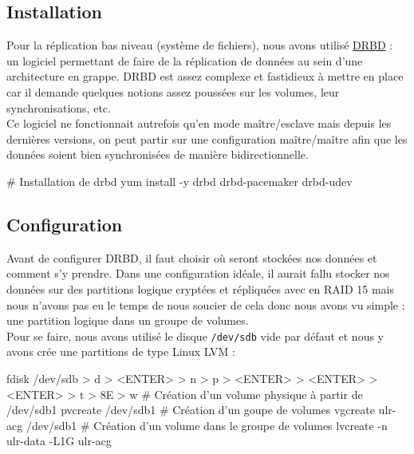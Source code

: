 \documentclass[11pt,a4paper]{report}
\begin{document}
            \subsection{Installation}
                
                Pour la réplication bas niveau (système de fichiers), nous avons utilisé \underline{\href{http://www.drbd.org/}{DRBD}} : un logiciel permettant de faire de la réplication de données au sein d'une architecture en grappe. DRBD est assez complexe et fastidieux à mettre en place car il demande quelques notions assez poussées sur les volumes, leur synchronisations, etc.\\
                
                Ce logiciel ne fonctionnait autrefois qu'en mode maître/esclave mais depuis les dernières versions, on peut partir sur une configuration maître/maître afin que les données soient bien synchronisées de manière bidirectionnelle.\\
                
                \begin{bashcode}
                    # Installation de drbd
                    yum install -y drbd drbd-pacemaker drbd-udev
                \end{bashcode}
                
            \subsection{Configuration}
                
                Avant de configurer DRBD, il faut choisir où seront stockées nos données et comment s'y prendre. Dans une configuration idéale, il aurait fallu stocker nos données sur des partitions logique cryptées et répliquées avec en RAID 15 mais nous n'avons pas eu le temps de nous soucier de cela donc nous avons vu simple : une partition logique dans un groupe de volumes.\\
                
                Pour se faire, nous avons utilisé le disque \verb+/dev/sdb+ vide par défaut et nous y avons crée une partitions de type Linux LVM :\\
                
                \begin{bashcode}
                    fdisk /dev/sdb
                    > d
                    > <ENTER>
                    > n
                    > p
                    > <ENTER>
                    > <ENTER>
                    > <ENTER>
                    > t
                    > 8E
                    > w
                    # Création d'un volume physique à partir de /dev/sdb1
                    pvcreate /dev/sdb1
                    # Création d'un goupe de volumes
                    vgcreate ulr-acg /dev/sdb1
                    # Création d'un volume dans le groupe de volumes
                    lvcreate -n ulr-data -L1G ulr-acg
                \end{bashcode}
                
\end{document}
